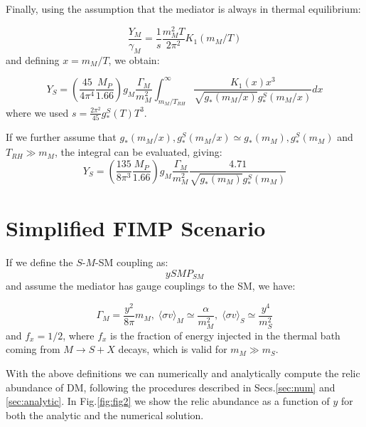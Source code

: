 \documentclass{article}
\def\to{\rightarrow}
\def\be{\begin{equation}}
\def\ee{\end{equation}}
\def\to{\rightarrow}
\begin{document}
Finally, using the assumption that the mediator is always in thermal equilibrium:

\be
\frac{Y_M}{\gamma_M} = \frac{1}{s} \frac{m_M^2 T}{2\pi^2} K_1\left(m_M/T\right)
\ee
and defining $x=m_M/T$, we obtain:

\be
Y_S = \left(\frac{45}{4 \pi^4} \frac{M_P}{1.66}\right)  g_M \frac{\Gamma_M}{m_M^2}   \int_{m_M/T_{RH}}^{\infty}  \frac{K_1(x) x^3}{\sqrt{g_*(m_M/x)} g_*^{S}(m_M/x)} dx
\ee
where we used $s = \frac{2 \pi^2}{45} g_*^{S}(T) T^3$.

If we further assume that $g_*(m_M/x), g_*^{S}(m_M/x) \simeq g_*(m_M), g_*^{S}(m_M)$ and $T_{RH} \gg m_M$, the integral
can be evaluated, giving:
\be
Y_S = \left(\frac{135}{8 \pi^3} \frac{M_P}{1.66}\right)  g_M \frac{\Gamma_M}{m_M^2} \frac{4.71}{\sqrt{g_*(m_M)} g_*^{S}(m_M)}
\ee



\section{Simplified FIMP Scenario}

If we define the $S$-$M$-SM coupling as:
\be
y S M P_{SM}
\ee
and assume the mediator has gauge couplings to the SM, we have:

\be
\Gamma_M  = \frac{y^2}{8 \pi} m_M, \; \langle \sigma v \rangle_M  \simeq \frac{\alpha}{m_M^2}, \; \langle \sigma v \rangle_S  \simeq \frac{y^4}{m_S^2}
\ee
and $f_x = 1/2$, where $f_x$ is the fraction of energy injected in the thermal bath coming from $M \to S + X$ decays, which
is valid for $m_M \gg m_S$.

With the above definitions we can numerically and analytically compute the relic abundance
of DM, following the procedures described in Secs.\ref{sec:num} and \ref{sec:analytic}.
In Fig.\ref{fig:fig2}  we show the relic abundance as a function of $y$ for both the
analytic and the numerical solution.
\end{document}
